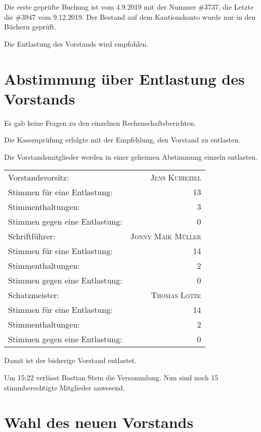 \documentclass[DIV=calc,parksip=half*]{scrartcl}
\newcommand{\qbi}{Jens Kubieziel}
\newcommand{\jonny}{Jonny Maik Müller}
\newcommand{\thomas}{Thomas Lotze}
\begin{document}
Die erste geprüfte Buchung ist vom 4.9.2019 mit der Nummer \#3737,
die Letzte die \#3947 vom 9.12.2019.
Der Bestand auf dem Kautionskonto wurde nur in den Büchern geprüft.

Die Entlastung des Vorstands wird empfohlen.

\section{Abstimmung über Entlastung des Vorstands}

Es gab keine Fragen zu den einzelnen Rechenschaftsberichten.

Die Kassenprüfung erfolgte mit der Empfehlung, den Vorstand zu entlasten.

Die Vorstandsmitglieder werden in einer geheimen Abstimmung einzeln entlasten.

  \begin{tabularx}{\linewidth}{Xr}
    \toprule
    Vorstandsvorsitz: & \textsc{\qbi{}}\\
    Stimmen für eine Entlastung: & 13 \\
    Stimmenthaltungen: & 3 \\
    Stimmen gegen eine Entlastung: & 0\\
    \midrule
    Schriftführer: & \textsc{\jonny{}}\\
    Stimmen für eine Entlastung: & 14 \\
    Stimmenthaltungen: & 2 \\
    Stimmen gegen eine Entlastung: & 0\\
    \midrule
    Schatzmeister: & \textsc{\thomas{}}\\
    Stimmen für eine Entlastung: & 14 \\
    Stimmenthaltungen: & 2 \\
    Stimmen gegen eine Entlastung: & 0\\
    \bottomrule
\end{tabularx}
Damit ist der bisherige Vorstand entlastet.

Um 15:22 verlässt Bastian Stein die Versammlung. Nun sind noch 15 stimmberechtigte Mitglieder anwesend.

\section{Wahl des neuen Vorstands}
\end{document}
